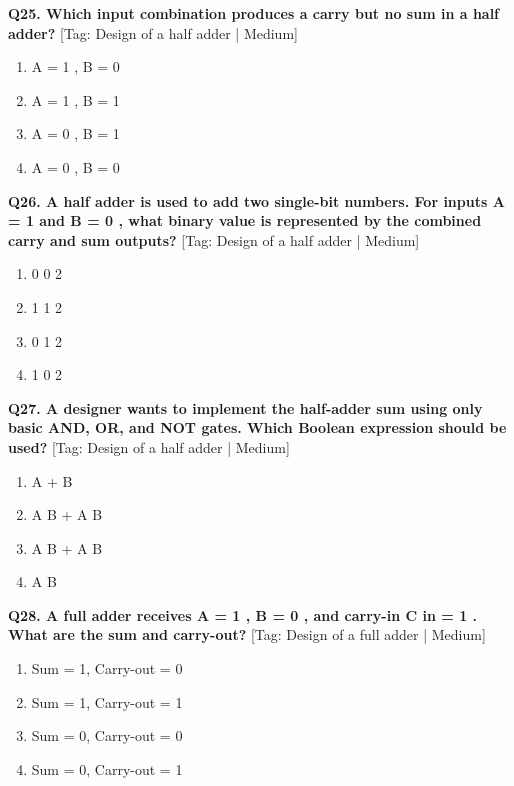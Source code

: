 \noindent\textbf{Q25. Which input combination produces a carry but no sum in a half adder?} \hfill [Tag: Design of a half adder | Medium]
\begin{enumerate}[label=(\alph*),topsep=2pt,itemsep=1pt,partopsep=0pt,parsep=0pt]
    \item {A = 1 , B = 0}
    \item {A = 1 , B = 1}
    \item {A = 0 , B = 1}
    \item {A = 0 , B = 0}
\end{enumerate}
\vspace{2mm}

\noindent\textbf{Q26. A half adder is used to add two single-bit numbers. For inputs A = 1 and B = 0 , what binary value is represented by the combined carry and sum outputs?} \hfill [Tag: Design of a half adder | Medium]
\begin{enumerate}[label=(\alph*),topsep=2pt,itemsep=1pt,partopsep=0pt,parsep=0pt]
    \item {0 0 2}
    \item {1 1 2}
    \item {0 1 2}
    \item {1 0 2}
\end{enumerate}
\vspace{2mm}

\noindent\textbf{Q27. A designer wants to implement the half-adder sum using only basic AND, OR, and NOT gates. Which Boolean expression should be used?} \hfill [Tag: Design of a half adder | Medium]
\begin{enumerate}[label=(\alph*),topsep=2pt,itemsep=1pt,partopsep=0pt,parsep=0pt]
    \item {A + B}
    \item {A B + A B}
    \item {A B + A B}
    \item {A B}
\end{enumerate}
\vspace{2mm}

\noindent\textbf{Q28. A full adder receives A = 1 , B = 0 , and carry-in C in = 1 . What are the sum and carry-out?} \hfill [Tag: Design of a full adder | Medium]
\begin{enumerate}[label=(\alph*),topsep=2pt,itemsep=1pt,partopsep=0pt,parsep=0pt]
    \item {Sum = 1, Carry-out = 0}
    \item {Sum = 1, Carry-out = 1}
    \item {Sum = 0, Carry-out = 0}
    \item {Sum = 0, Carry-out = 1}
\end{enumerate}
\vspace{2mm}

